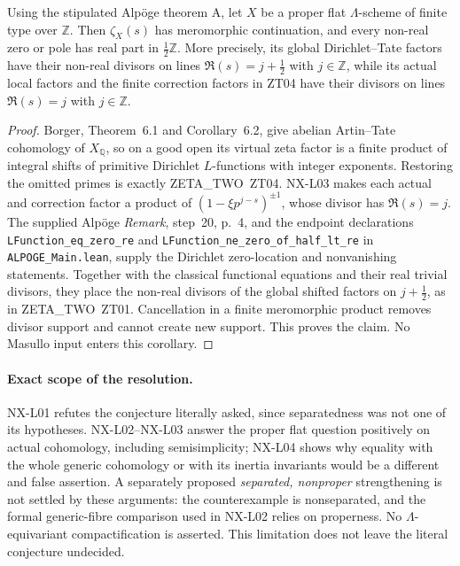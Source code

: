 \begin{corollary}
\label{NX-L06}
Using the stipulated Alp\"oge theorem A, let $X$ be a proper flat
$\Lambda$-scheme of finite type over $\mathbb Z$.  Then $\zeta_X(s)$
has meromorphic continuation, and every non-real zero or pole has
real part in $\tfrac12\mathbb Z$.  More precisely, its global
Dirichlet--Tate factors have their non-real divisors on lines
$\Re(s)=j+\tfrac12$ with $j\in\mathbb Z$, while its actual local
factors and the finite correction factors in ZT04 have their divisors
on lines $\Re(s)=j$ with $j\in\mathbb Z$.
\end{corollary}

\begin{proof}
Borger, Theorem~6.1 and Corollary~6.2, give abelian Artin--Tate
cohomology of $X_{\mathbb Q}$, so on a good open its virtual zeta
factor is a finite product of integral shifts of primitive Dirichlet
$L$-functions with integer exponents.  Restoring the omitted primes
is exactly ZETA\_TWO~ZT04.  NX-L03 makes each actual and correction
factor a product of $(1-\xi p^{j-s})^{\pm1}$, whose divisor has
$\Re(s)=j$.  The supplied Alp\"oge \emph{Remark}, step~20, p.~4,
and the endpoint declarations
\texttt{LFunction\_eq\_zero\_re} and
\texttt{LFunction\_ne\_zero\_of\_half\_lt\_re} in
\texttt{ALPOGE\_Main.lean}, supply the Dirichlet zero-location and
nonvanishing statements.  Together with the classical functional
equations and their real trivial divisors, they place the non-real
divisors of the global shifted factors on $j+\tfrac12$, as in
ZETA\_TWO~ZT01.  Cancellation in a finite meromorphic product removes
divisor support and cannot create new support.  This proves the claim.
No Masullo input enters this corollary.
\end{proof}

\paragraph{Exact scope of the resolution.}
NX-L01 refutes the conjecture literally asked, since separatedness
was not one of its hypotheses.  NX-L02--NX-L03 answer the proper flat
question positively on actual cohomology, including semisimplicity;
NX-L04 shows why equality with the whole generic cohomology or with
its inertia invariants would be a different and false assertion.
A separately proposed \emph{separated, nonproper} strengthening is
not settled by these arguments: the counterexample is nonseparated,
and the formal generic-fibre comparison used in NX-L02 relies on
properness.  No $\Lambda$-equivariant compactification is asserted.
This limitation does not leave the literal conjecture undecided.

